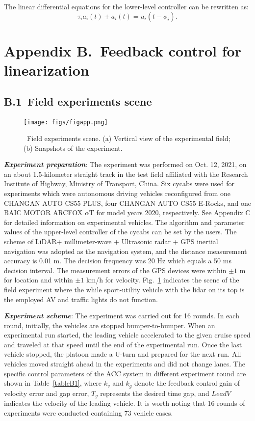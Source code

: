 \documentclass[journal]{IEEEtran}
\begin{document}
The linear differential equations for the lower-level controller can be rewritten as:
\begin{equation}
  \tau_i\dot{a_i}\left(t\right)+a_i\left(t\right)=u_i(t-\phi_i).
  \label{eqA6}
\end{equation}



\section*{Appendix B.~Feedback control for linearization}
\label{AppendixB}
\subsection*{B.1~Field experiments scene}
\label{Section B.1}

\begin{figure}
  \centering
  \texttt{[image: figs/figapp.png]}
  \caption{~Field experiments scene. (a) Vertical view of the experimental field; (b) Snapshots of the experiment.}
  \label{figB1}
\end{figure}

\textbf{\emph{Experiment preparation}}: The experiment was performed on Oct. 12, 2021, on an about 1.5-kilometer straight track in the test field affiliated with the Research Institute of Highway, Ministry of Transport, China. Six cycabs were used for experiments which were autonomous driving vehicles reconfigured from one CHANGAN AUTO CS55 PLUS, four CHANGAN AUTO CS55 E-Rocks, and one BAIC MOTOR ARCFOX $\alpha$T for model years 2020, respectively. See Appendix C for detailed information on experimental vehicles. The algorithm and parameter values of the upper-level controller of the cycabs can be set by the users. The scheme of LiDAR+ millimeter-wave + Ultrasonic radar + GPS inertial navigation was adopted as the navigation system, and the distance measurement accuracy is 0.01 m. The decision frequency was 20 Hz which equals a 50 ms decision interval. The measurement errors of the GPS devices were within $\pm1$ m for location and within $\pm1$ km/h for velocity. Fig.~\ref{figB1} indicates the scene of the field experiment where the while sport-utility vehicle with the lidar on its top is the employed AV and traffic lights do not function.

\textbf{\emph{Experiment scheme}}: The experiment was carried out for 16 rounds. In each round, initially, the vehicles are stopped bumper-to-bumper. When an experimental run started, the leading vehicle accelerated to the given cruise speed and traveled at that speed until the end of the experimental run. Once the last vehicle stopped, the platoon made a U-turn and prepared for the next run. All vehicles moved straight ahead in the experiments and did not change lanes. The specific control parameters of the ACC system in different experiment round are shown in Table~\ref{tableB1}, where $k_{v}$ and $k_{g}$ denote the feedback control gain of velocity error and gap error, $T_{g}$ represents the desired time gap, and $LeadV$ indicates the velocity of the leading vehicle. It is worth noting that 16 rounds of experiments were conducted containing 73 vehicle cases.
\end{document}
